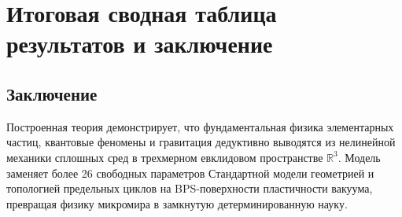 \documentclass[12pt,a4paper]{article}
\begin{document}
	\section{Итоговая сводная таблица результатов и заключение}

	\subsection{Заключение}
	Построенная теория демонстрирует, что фундаментальная физика элементарных частиц, квантовые феномены и гравитация дедуктивно выводятся из нелинейной механики сплошных сред в трехмерном евклидовом пространстве $\mathbb{R}^3$. Модель заменяет более 26 свободных параметров Стандартной модели геометрией и топологией предельных циклов на BPS-поверхности пластичности вакуума, превращая физику микромира в замкнутую детерминированную науку.
	
\end{document}
